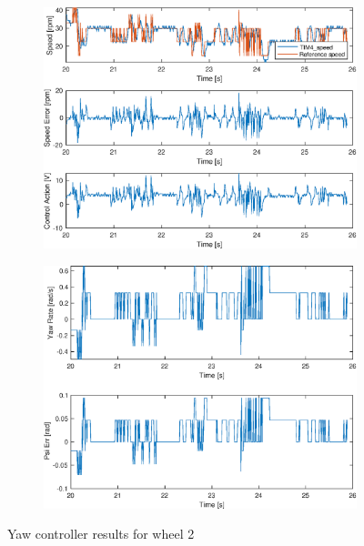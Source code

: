\begin{figure}[H]
    \centering
    \begin{subfigure}{0.7\textwidth}
        \centering
        \includegraphics[width=\textwidth]{lab4/figures/wheel_2.eps}
    \end{subfigure}
    
    \vspace{0.5cm} %

    \begin{subfigure}{0.7\textwidth}
        \centering
        \includegraphics[width=\textwidth]{lab4/figures/yaw_2.eps}
    \end{subfigure}

    \caption{Yaw controller results for wheel 2}
    \label{fig:yaw_controller_results_wheel_2}
\end{figure}

